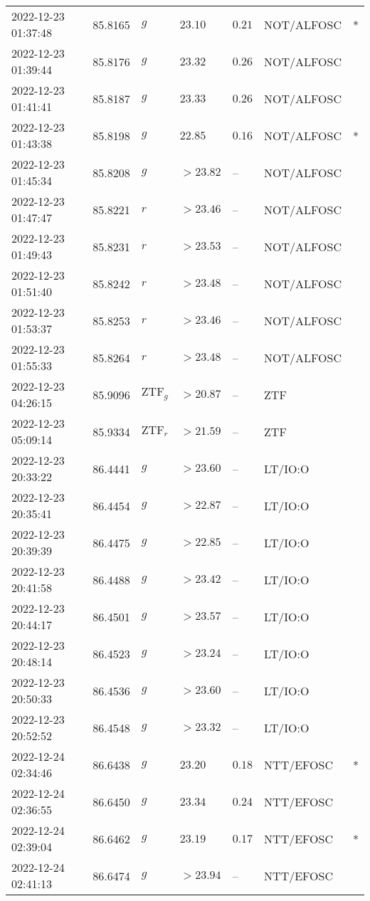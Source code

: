 \documentclass{nature_plusfigure}
\begin{document}
\begin{supplement}
\begin{center}
\begin{longtable}{lllllll}
2022-12-23 01:37:48 & 85.8165 & $g$ & $23.10$ & $0.21$ & NOT/ALFOSC & * \\ 
2022-12-23 01:39:44 & 85.8176 & $g$ & $23.32$ & $0.26$ & NOT/ALFOSC &  \\ 
2022-12-23 01:41:41 & 85.8187 & $g$ & $23.33$ & $0.26$ & NOT/ALFOSC &  \\ 
2022-12-23 01:43:38 & 85.8198 & $g$ & $22.85$ & $0.16$ & NOT/ALFOSC & * \\ 
2022-12-23 01:45:34 & 85.8208 & $g$ & $>23.82$ & -- & NOT/ALFOSC &  \\ 
2022-12-23 01:47:47 & 85.8221 & $r$ & $>23.46$ & -- & NOT/ALFOSC &  \\ 
2022-12-23 01:49:43 & 85.8231 & $r$ & $>23.53$ & -- & NOT/ALFOSC &  \\ 
2022-12-23 01:51:40 & 85.8242 & $r$ & $>23.48$ & -- & NOT/ALFOSC &  \\ 
2022-12-23 01:53:37 & 85.8253 & $r$ & $>23.46$ & -- & NOT/ALFOSC &  \\ 
2022-12-23 01:55:33 & 85.8264 & $r$ & $>23.48$ & -- & NOT/ALFOSC &  \\ 
2022-12-23 04:26:15 & 85.9096 & $\mathrm{ZTF}_{g}$ & $>20.87$ & -- & ZTF &  \\ 
2022-12-23 05:09:14 & 85.9334 & $\mathrm{ZTF}_{r}$ & $>21.59$ & -- & ZTF &  \\ 
2022-12-23 20:33:22 & 86.4441 & $g$ & $>23.60$ & -- & LT/IO:O &  \\ 
2022-12-23 20:35:41 & 86.4454 & $g$ & $>22.87$ & -- & LT/IO:O &  \\ 
2022-12-23 20:39:39 & 86.4475 & $g$ & $>22.85$ & -- & LT/IO:O &  \\ 
2022-12-23 20:41:58 & 86.4488 & $g$ & $>23.42$ & -- & LT/IO:O &  \\ 
2022-12-23 20:44:17 & 86.4501 & $g$ & $>23.57$ & -- & LT/IO:O &  \\ 
2022-12-23 20:48:14 & 86.4523 & $g$ & $>23.24$ & -- & LT/IO:O &  \\ 
2022-12-23 20:50:33 & 86.4536 & $g$ & $>23.60$ & -- & LT/IO:O &  \\ 
2022-12-23 20:52:52 & 86.4548 & $g$ & $>23.32$ & -- & LT/IO:O &  \\ 
2022-12-24 02:34:46 & 86.6438 & $g$ & $23.20$ & $0.18$ & NTT/EFOSC & * \\ 
2022-12-24 02:36:55 & 86.6450 & $g$ & $23.34$ & $0.24$ & NTT/EFOSC &  \\ 
2022-12-24 02:39:04 & 86.6462 & $g$ & $23.19$ & $0.17$ & NTT/EFOSC & * \\ 
2022-12-24 02:41:13 & 86.6474 & $g$ & $>23.94$ & -- & NTT/EFOSC &  \\ 

\end{longtable}
\end{center}
\end{supplement}
\end{document}
